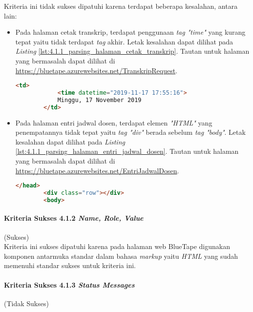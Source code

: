 Kriteria ini tidak sukses dipatuhi karena terdapat beberapa kesalahan, antara lain:

\begin{itemize}
    \item Pada halaman cetak transkrip, terdapat penggunaan \textit{tag "time"} yang kurang tepat yaitu tidak terdapat \textit{tag} akhir. Letak kesalahan dapat dilihat pada \textit{Listing} \ref{lst:4.1.1_parsing_halaman_cetak_transkrip}. Tautan untuk halaman yang bermasalah dapat dilihat di \url{https://bluetape.azurewebsites.net/TranskripRequest}.
    \begin{lstlisting}[frame=single, label={lst:4.1.1_parsing_halaman_cetak_transkrip}, language=HTML, caption=Pelanggaran Kriteria Sukses 4.1.1 pada Halaman Cetak Transkrip]
        <td>
            <time datetime="2019-11-17 17:55:16">
            Minggu, 17 November 2019
        </td>
    \end{lstlisting}

    \item Pada halaman entri jadwal dosen, terdapat elemen \textit{"HTML"} yang penempatannya tidak tepat yaitu \textit{tag "div"} berada sebelum \textit{tag "body"}. Letak kesalahan dapat dilihat pada \textit{Listing} \ref{lst:4.1.1_parsing_halaman_entri_jadwal_dosen}. Tautan untuk halaman yang bermasalah dapat dilihat di \url{https://bluetape.azurewebsites.net/EntriJadwalDosen}.
    \begin{lstlisting}[frame=single, label={lst:4.1.1_parsing_halaman_entri_jadwal_dosen}, language=HTML, caption=Pelanggaran Kriteria Sukses 4.1.1 pada Halaman Entri Jadwal Dosen]
        </head>
        <div class="row"></div>        
        <body>
    \end{lstlisting}
\end{itemize}

\paragraph{Kriteria Sukses 4.1.2 \textit{Name, Role, Value}}
\label{par:kepatuhan_bluetape_kriteria_sukses_4.1.2}
(Sukses)\\

Kriteria ini sukses dipatuhi karena pada halaman web BlueTape digunakan komponen antarmuka standar dalam bahasa \textit{markup} yaitu \textit{HTML} yang sudah memenuhi standar sukses untuk kriteria ini.

\paragraph{Kriteria Sukses 4.1.3 \textit{Status Messages}}
\label{par:kepatuhan_bluetape_kriteria_sukses_4.1.3}
(Tidak Sukses)\\

